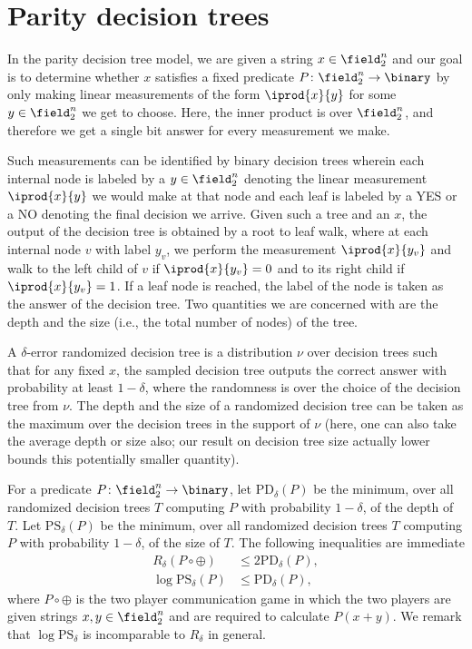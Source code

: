 \section{Parity decision trees}
\label{sec:ham:pdt}

\def\PD{\mathrm{PD}}
\def\PS{\mathrm{PS}}
In the parity decision tree model, we are given a string 
$x\in\field_2^n$ and our goal is to determine whether 
$x$ satisfies a fixed predicate
$P\colon\field_2^n\to\binary$ by only making linear 
measurements of the form $\iprod{x}{y}$ for some 
$y\in \field_2^n$ we get to choose. Here, the inner product
is over $\field_2^n$, and therefore we get a single bit 
answer for every measurement we make.

Such measurements can be identified by binary decision
trees wherein each internal node is labeled by a
$y\in\field_2^n$ denoting the linear measurement
$\iprod{x}{y}$ we would make at that node and each leaf
is labeled by a YES or a NO denoting the final decision we 
arrive. Given such a tree and an $x$, the output of the 
decision tree is obtained by a root to leaf walk, where at 
each internal node $v$ with label $y_v$, 
we perform the measurement 
$\iprod{x}{y_v}$ and walk to the left child of $v$ if 
$\iprod{x}{y_v}=0$ and to its right child if 
$\iprod{x}{y_v}=1$. If a leaf node is reached, 
the label of the node is taken as the answer of 
the decision tree. Two quantities we are concerned with
are the depth and the size (i.e., the total number of nodes)
of the tree.

A $\delta$-error randomized decision tree is a distribution
$\nu$ over decision trees such that for any fixed $x$, 
the sampled decision tree outputs the correct answer with 
probability at least $1-\delta$, where the randomness is over 
the choice of the decision tree from $\nu$. 
The depth and the size of a randomized decision tree can be 
taken as the maximum over the decision trees in the support 
of $\nu$ (here, one can also take the average depth or size also;
our result on decision tree size actually lower bounds this 
potentially smaller quantity).

For a predicate $P\colon\field_2^n\to\binary$, let 
$\PD_\delta(P)$ be the minimum, over all randomized decision 
trees $T$ computing $P$ with probability $1-\delta$, of the 
depth of $T$.
Let $\PS_\delta(P)$ be the minimum, over all randomized decision 
trees $T$ computing $P$ with probability $1-\delta$, of the 
size of $T$. The following inequalities are immediate
\begin{align}
  R_\delta(P\circ\oplus)&\le 2\PD_\delta(P)\label{eq:rvspd},\\
  \log\PS_\delta(P)&\le \PD_\delta(P)\nonumber,
\end{align}
where $P\circ \oplus$ is the two player communication game 
in which the two players are given strings $x,y\in\field_2^n$ 
and are required to calculate $P(x+y)$. 
We remark that $\log \PS_\delta$ is incomparable to $R_\delta$ 
in general.

